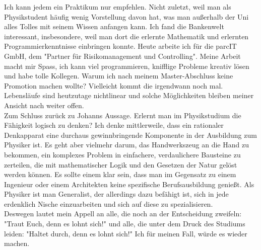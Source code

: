 \begin{multicols}{2}
Ich kann jedem ein Praktikum nur empfehlen. Nicht zuletzt, weil man als Physikstudent häufig wenig Vorstellung davon hat, was man außerhalb der Uni alles Tolles mit seinem Wissen anfangen kann.
Ich fand die Bankenwelt interessant, insbesondere, weil man dort die erlernte Mathematik und erlernten Programmierkenntnisse einbringen konnte.
Heute arbeite ich für die parcIT GmbH, dem "Partner für Risikomanagement und Controlling".
Meine Arbeit macht mir Spass, ich kann viel programmieren, knifflige Probleme kreativ lösen und habe tolle Kollegen. Warum ich nach meinem Master-Abschluss keine Promotion machen wollte?
Vielleicht kommt die irgendwann noch mal. Lebensläufe sind heutzutage nichtlinear und solche Möglichkeiten bleiben meiner Ansicht nach weiter offen. \\ 

Zum Schluss zurück zu Johanns Aussage. Erlernt man im Physikstudium die Fähigkeit logisch zu denken? Ich denke mittlerweile,
dass ein rationaler Denkapparat eine durchaus gewinnbringende Komponente in der Ausbildung zum Physiker ist. Es geht aber vielmehr darum,
das Handwerkszeug an die Hand zu bekommen, ein komplexes Problem in einfachere, verdaulichere Bausteine zu zerteilen,
die mit mathematischer Logik und den Gesetzen der Natur gelöst werden können.
Es sollte einem klar sein, dass man im Gegensatz zu einem Ingenieur oder einem Architekten keine spezifische Berufsausbildung genießt.
Als Physiker ist man Generalist, der allerdings dazu befähigt ist, sich in jede erdenklich Nische einzuarbeiten und sich auf diese zu spezialisieren. \\ 

Deswegen lautet mein Appell an alle, die noch an der Entscheidung zweifeln: "Traut Euch, denn es lohnt sich!" und alle, die unter dem Druck des Studiums leiden: "Haltet durch, denn es lohnt sich!" Ich für meinen Fall, würde es wieder machen. \\ 

\vspace{0.8cm}




\end{multicols}
